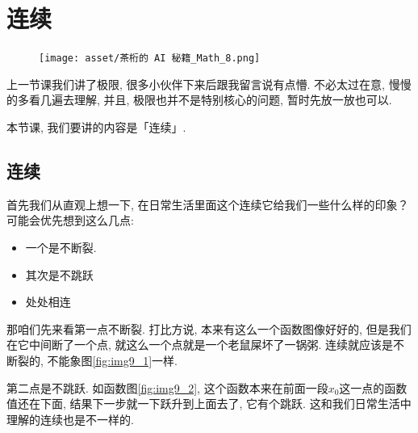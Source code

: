 \chapter{连续}

\begin{figure}[ht]
  \centering
  \texttt{[image: asset/茶桁的 AI 秘籍\_Math\_8.png]}
\end{figure}

\newpage

上一节课我们讲了极限, 很多小伙伴下来后跟我留言说有点懵. 不必太过在意, 慢慢的多看几遍去理解, 并且, 极限也并不是特别核心的问题, 暂时先放一放也可以. 

本节课, 我们要讲的内容是「连续」. 

\section{连续}

首先我们从直观上想一下, 在日常生活里面这个连续它给我们一些什么样的印象？可能会优先想到这么几点: 

\begin{itemize}
  \item 一个是不断裂. 
  \item 其次是不跳跃
  \item 处处相连
\end{itemize}

那咱们先来看第一点不断裂. 打比方说, 本来有这么一个函数图像好好的, 但是我们在它中间断了一个点, 就这么一个点就是一个老鼠屎坏了一锅粥. 连续就应该是不断裂的, 不能象图\ref{fig:img9_1}一样.

第二点是不跳跃. 如函数图\ref{fig:img9_2}, 这个函数本来在前面一段$x_0$这一点的函数值还在下面, 结果下一步就一下跃升到上面去了, 它有个跳跃. 这和我们日常生活中理解的连续也是不一样的. 

